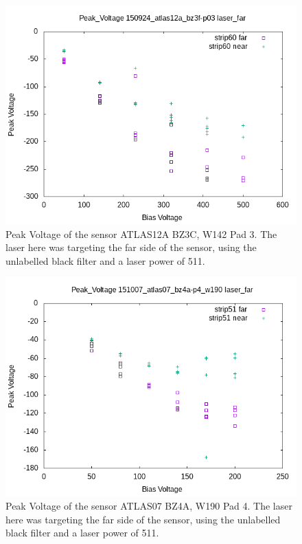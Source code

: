 \documentclass{report}
\begin{document}
            \begin{figure}[h] 
                \includegraphics[height=.4\textheight]{Peak_Voltage__150924_atlas12a_bz3f-p03__laser_far}
                \centering
                \caption{ Peak Voltage of the sensor ATLAS12A BZ3C, W142 Pad 3. The laser here was targeting the far side of the sensor, using the unlabelled black filter and a laser power of 511. }
                \label{fig:Peak_Voltage__150924_atlas12a_bz3f-p03__laser_far}
            \end{figure}

            \begin{figure}[h] 
                \includegraphics[height=.4\textheight]{Peak_Voltage__151007_atlas07_bz4a-p4_w190__laser_far}
                \centering
                \caption{ Peak Voltage of the sensor ATLAS07 BZ4A, W190 Pad 4. The laser here was targeting the far side of the sensor, using the unlabelled black filter and a laser power of 511. }
                \label{fig:Peak_Voltage__151007_atlas07_bz4a-p4_w190__laser_far}
            \end{figure}
\end{document}
